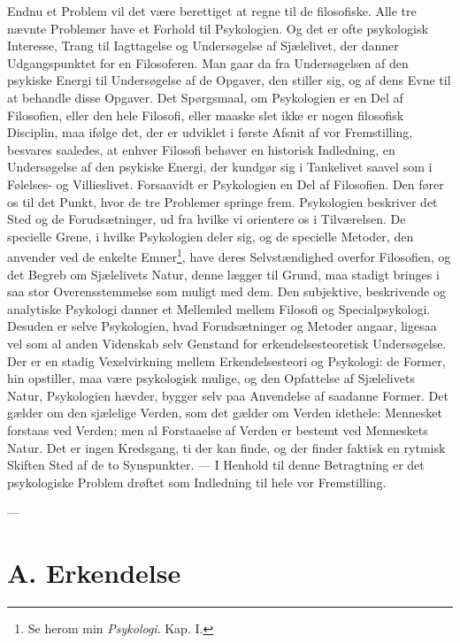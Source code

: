 \documentclass[12pt,a4paper]{book}
\newcommand{\apage}[1]{\marginnote{\footnotesize\textit{[#1]}}}
\begin{document}
Endnu et Problem vil det være berettiget at regne til de filosofiske. Alle tre
nævnte Problemer have et Forhold til Psykologien. Og det er ofte psykologisk
Interesse, Trang til Iagttagelse og Undersøgelse af Sjælelivet, der danner
Udgangspunktet for en Filosoferen. Man gaar da fra Undersøgelsen af den psykiske
Energi til Undersøgelse af de Opgaver, den stiller sig, og af dens Evne til at
behandle disse Opgaver. Det Spørgsmaal, om Psykologien er en Del af Filosofien,
eller den hele Filosofi, eller maaske slet ikke er nogen filosofisk Disciplin, maa
ifølge det, der er udviklet i første Afsnit af vor Fremstilling, besvares saaledes,
at enhver Filosofi behøver en historisk Indledning, en Undersøgelse af den psykiske
Energi, der kundgør sig i Tankelivet saavel som i Følelses- og Villieslivet.
Forsaavidt er Psykologien en Del af Filosofien. Den fører os til det Punkt, hvor de
tre Problemer springe frem. Psykologien beskriver det Sted og de Forudsætninger,
ud fra hvilke vi orientere os i Tilværelsen. De specielle Grene, i hvilke
Psykologien deler sig, og de specielle Metoder, den anvender ved de enkelte
Emner\footnote{Se herom min \emph{Psykologi}. Kap. I.}, have deres Selvstændighed
overfor Filosofien, og det Begreb om Sjælelivets Natur, denne lægger til Grund, maa
stadigt bringes i saa stor Overensstemmelse som muligt med dem. Den subjektive,
beskrivende og analytiske Psykologi danner et Mellemled mellem Filosofi og
Specialpsykologi. Desuden er selve Psykologien, hvad Forudsætninger og Metoder
angaar, ligesaa vel som al anden \apage{254} Videnskab selv Genstand for erkendelsesteoretisk
Undersøgelse. Der er en stadig Vexelvirkning mellem Erkendelsesteori og Psykologi:
de Former, hin opstiller, maa være psykologisk mulige, og den Opfattelse af
Sjælelivets Natur, Psykologien hævder, bygger selv paa Anvendelse af saadanne
Former. Det gælder om den sjælelige Verden, som det gælder om Verden idethele:
Mennesket forstaas ved Verden; men al Forstaaelse af Verden er bestemt ved
Menneskets Natur. Det er ingen Kredsgang, ti der kan finde, og der finder faktisk
en rytmisk Skiften Sted af de to Synspunkter. --- I Henhold til denne Betragtning
er det psykologiske Problem drøftet som Indledning til hele vor Fremstilling.

\begin{center}---\end{center}

\section*{A. Erkendelse}
\label{sec:erkendelse}
\end{document}
